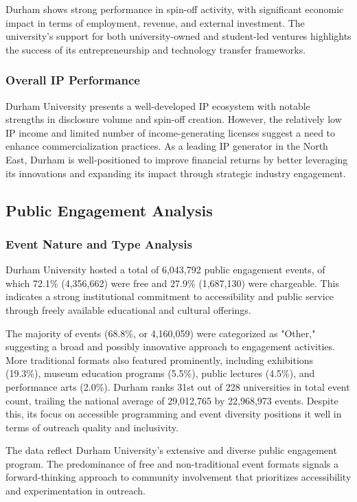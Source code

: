 \documentclass[journal,onecolumn, 10pt,draftclsnofoot]{IEEEtran}
\begin{document}
Durham shows strong performance in spin-off activity, with significant economic impact in terms of employment, revenue, and external investment. The university's support for both university-owned and student-led ventures highlights the success of its entrepreneurship and technology transfer frameworks.

\subsubsection{Overall IP Performance}

Durham University presents a well-developed IP ecosystem with notable strengths in disclosure volume and spin-off creation. However, the relatively low IP income and limited number of income-generating licenses suggest a need to enhance commercialization practices. As a leading IP generator in the North East, Durham is well-positioned to improve financial returns by better leveraging its innovations and expanding its impact through strategic industry engagement.

\subsection{Public Engagement Analysis}

\subsubsection{Event Nature and Type Analysis}

Durham University hosted a total of 6,043,792 public engagement events, of which 72.1\% (4,356,662) were free and 27.9\% (1,687,130) were chargeable. This indicates a strong institutional commitment to accessibility and public service through freely available educational and cultural offerings.

The majority of events (68.8\%, or 4,160,059) were categorized as "Other," suggesting a broad and possibly innovative approach to engagement activities. More traditional formats also featured prominently, including exhibitions (19.3\%), museum education programs (5.5\%), public lectures (4.5\%), and performance arts (2.0\%). Durham ranks 31st out of 228 universities in total event count, trailing the national average of 29,012,765 by 22,968,973 events. Despite this, its focus on accessible programming and event diversity positions it well in terms of outreach quality and inclusivity.

The data reflect Durham University's extensive and diverse public engagement program. The predominance of free and non-traditional event formats signals a forward-thinking approach to community involvement that prioritizes accessibility and experimentation in outreach.
\end{document}
